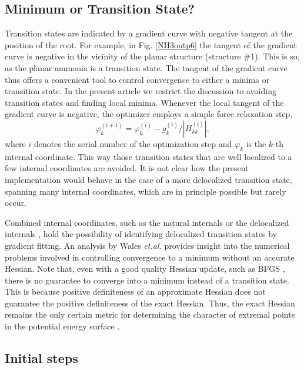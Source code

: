 \documentclass[prl,twocolumn,showpacs,twocolumngrid,superbib]{revtex4}
\begin{document}
\subsection{Minimum or Transition State?}

Transition states are indicated by a gradient curve with  negative tangent at the position
of the root.  For example, in Fig. \ref{NH3outp6} the tangent of the gradient curve is negative 
in the vicinity of the planar structure (structure \#1). This is so, as the planar ammonia 
is a transition state. The tangent of the gradient curve thus offers a convenient tool 
to control convergence to either a minima or transition state.  In the present article we 
restrict the discussion to avoiding transition states and finding local minima. 
Whenever the local tangent of the gradient curve is negative, the optimizer employs a simple force relaxation step,
\begin{equation}
\label{tseq}
\varphi_{k}^{(i+1)} = \varphi_{k}^{(i)} -g_{k}^{(i)}/|H_{kk}^{(i)}| ,
\end{equation}
where $i$ denotes the serial number of the optimization step and $\varphi_{k}$ is the $k$-th internal coordinate.
This way those transition states that are well localized to a few internal coordinates
are avoided.  It is not clear how the present implementation would behave in the 
case of a more delocalized transition state, spanning many internal coordinates, which 
are in principle possible but rarely occur.  

Combined internal coordinates, such as the natural internals \cite{Pulay_natural_internals} or the
delocalized internals \cite{Baker_deloc_1}, hold the possibility of identifying delocalized transition 
states by gradient fitting.  An analysis by  Wales {\it et.al.} \cite{Wales_saddlepoint} provides 
insight into the numerical problems involved in controlling convergence to a minimum without an 
accurate Hessian.  Note that, even with a good quality Hessian update, such as BFGS \cite{RFletcher},
there is no guarantee to converge into a minimum instead of a transition state. 
This is because positive definiteness of an approximate Hessian does not guarantee
the positive definiteness of the exact Hessian.  Thus, the exact Hessian remains the only 
certain metric for determining the character of extremal points in the potential energy 
surface \cite{Pulay_natural_internals}.

\subsection{Initial steps}
\end{document}
